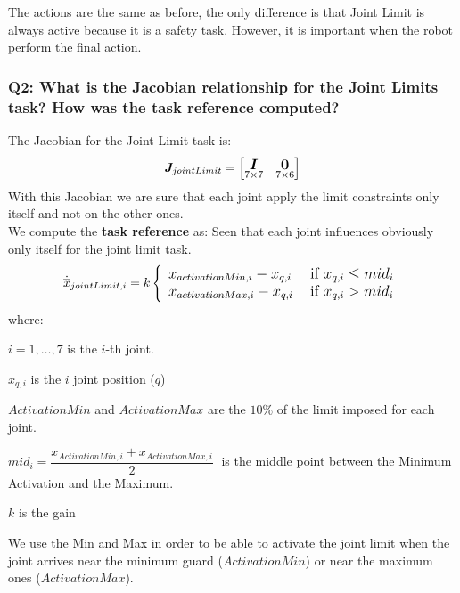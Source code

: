 \documentclass{article}
\begin{document}
The actions are the same as before, the only difference is that Joint Limit is always active because it is a safety task. However, it is important when the robot perform the final action. 

\subsubsection{Q2: What is the Jacobian relationship for the Joint Limits task? How was the task reference computed?}
The Jacobian for the Joint Limit task is:
\begin{equation}
\large
\boldsymbol{J}_{jointLimit}=
    \begin{bmatrix}
     \underset{7\times 7}{\boldsymbol{I}} & \underset{7\times6}{\boldsymbol{0}} \\
    \end{bmatrix}
\end{equation}
With this Jacobian we are sure that each joint apply the limit constraints only itself and not on the other ones.
\\
We compute the \textbf{task reference} as:
Seen that each joint influences obviously only itself for the joint limit task.\\
\begin{equation}
\large
\dot{\overline{x}}_{jointLimit,i} =k \left\{\begin{array}{ll}
x_{activationMin,i}-x_{q, i} & \text { if } x_{q, i} \leq mid_{i} \\
x_{activationMax,i}-x_{q, i} & \text { if } x_{q, i}>mid_{i}
\end{array}\right.
\end{equation}
	where:
	\begin{description}
		\item $i = 1,\dots,7$ is the $i$-th joint.
		\item $x_{q,i}$ is the $i$ joint position ($q$)
		\item $ActivationMin$ and $ActivationMax$ are the $10\%$ of the limit imposed for each joint.
		\item $mid_i = \dfrac{x_{ActivationMin,i} + x_{ActivationMax,i}}{2}\; $ is the middle point between the Minimum Activation and the Maximum.
		\item $k$ is the gain
\end{description}
We use the Min and Max in order to be able to activate the joint limit when the joint arrives near the minimum guard ($ActivationMin$) or near the maximum ones ($ActivationMax$).
\clearpage
\end{document}

